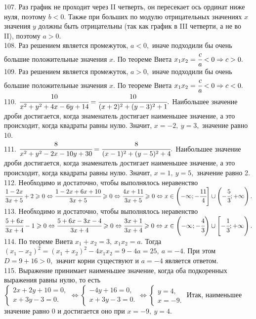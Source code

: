 \documentclass[12pt]{article}
\begin{document}
107. Раз график не проходит через II четверть, он пересекает ось ординат ниже нуля, поэтому $b<0.$ Также при больших по модулю отрицательных значениях $x$ значения $y$ должны быть отрицательны (так как график в III четверти, а не во II), поэтому $a>0.$\\
108. Раз решением является промежуток, $a<0,$ иначе подходили бы очень большие положительные значения $x.$ По теореме Виета $x_1x_2=\cfrac{c}{a}<0\Rightarrow c>0.$\\
109. Раз решением является промежуток, $a>0,$ иначе подходили бы очень большие положительные значения $x.$ По теореме Виета $x_1x_2=\cfrac{c}{a}<0\Rightarrow c<0.$\\
110. $\cfrac{10}{x^2+y^2+4x-6y+14}=\cfrac{10}{(x+2)^2+(y-3)^2+1}.$ Наибольшее значение дроби достигается, когда знаменатель достигает наименьшее значение, а это происходит, когда квадраты равны нулю. Значит, $x=-2,\ y=3,$ значение равно 10.\\
111. $\cfrac{8}{x^2+y^2-2x-10y+30}=\cfrac{8}{(x-1)^2+(y-5)^2+4}.$ Наибольшее значение дроби достигается, когда знаменатель достигает наименьшее значение, а это происходит, когда квадраты равны нулю. Значит, $x=1,\ y=5,$ значение равно 2.\\
112. Необходимо и достаточно, чтобы выполнялось неравенство $\cfrac{1-2x}{3x+5}+2\geqslant0\Leftrightarrow\cfrac{1-2x+6x+10}{3x+5}\geqslant0\Leftrightarrow
\cfrac{4x+11}{3x+5}\geqslant0\Leftrightarrow x\in\left(-\infty;-\cfrac{11}{4}\right]\cup\left(-\cfrac{5}{3};+\infty\right).$\\
113. Необходимо и достаточно, чтобы выполнялось неравенство $\cfrac{5+6x}{3x+4}-1\geqslant0\Leftrightarrow\cfrac{5+6x-3x-4}{3x+4}\geqslant0\Leftrightarrow
\cfrac{3x+1}{3x+4}\geqslant0\Leftrightarrow x\in\left(-\infty;-\cfrac{4}{3}\right)\cup\left[-\cfrac{1}{3};+\infty\right).$\\
114. По теореме Виета $x_1+x_2=3,\ x_1x_2=a.$ Тогда $(x_1-x_2)^2=(x_1+x_2)^2-4x_1x_2=9-4a=25,\ a=-4.$ При этом $D=9+16>0,$ значит корни существуют и $a=-4$ является ответом.\\
115. Выражение принимает наименьшее значение, когда оба подкоренных выражения равны нулю, то есть $\begin{cases} 2x+2y+10=0,\\ x+3y-3=0.\end{cases}
\Leftrightarrow \begin{cases} -4y+16=0,\\ x+3y-3=0.\end{cases}\Leftrightarrow \begin{cases} y=4,\\ x=-9.\end{cases}$ Итак, наименьшее значение равно 0 и достигается оно при $x=-9,\ y=4.$\\
\end{document}
